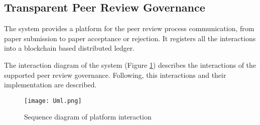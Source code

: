 

\subsection{Transparent Peer Review Governance}
\label{workflow}

The system provides a platform for the peer review process communication, from
paper submission to paper acceptance or rejection. It registers all the
interactions into a blockchain based distributed
ledger. %

The interaction diagram of the system (Figure \ref{InteractionDiagram})
describes the interactions of the supported peer review governance. Following,
this interactions and their implementation are described.

  \begin{figure}[!th]
    \texttt{[image: Uml.png]} \centering\caption{Sequence
      diagram of platform interaction}
    \label{InteractionDiagram}
  \end{figure}

